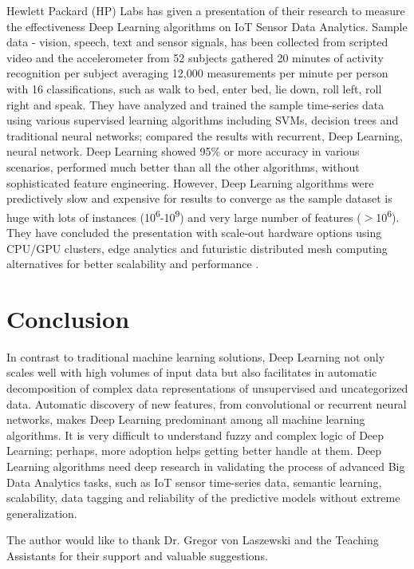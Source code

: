 \documentclass[sigconf]{acmart}
\begin{document}
	Hewlett Packard (HP) Labs has given a presentation of their research to measure the effectiveness Deep Learning algorithms on IoT Sensor Data Analytics. Sample data - vision, speech, text and sensor signals, has been collected from scripted video and the accelerometer from 52 subjects gathered 20 minutes of activity recognition per subject averaging 12,000 measurements per minute per person with 16 classifications, such as walk to bed, enter bed, lie down, roll left, roll right and speak. They have analyzed and trained the sample time-series data using various supervised learning algorithms including SVMs, decision trees and traditional neural networks; compared the results with recurrent, Deep Learning, neural network. Deep Learning showed 95\% or more accuracy in various scenarios, performed much better than all the other algorithms, without sophisticated feature engineering. However, Deep Learning algorithms were predictively slow and expensive for results to converge as the sample dataset is huge with lots of instances (10\textsuperscript{6}-10\textsuperscript{9}) and very large number of features ($>$10\textsuperscript{6}). They have concluded the presentation with scale-out hardware options using CPU/GPU clusters, edge analytics and futuristic distributed mesh computing alternatives for better scalability and performance \cite{Vassilieva2016}. 
			
	\section{Conclusion}		

	In contrast to traditional machine learning solutions, Deep Learning not only scales well with high volumes of input data but also facilitates in automatic decomposition of complex data representations of unsupervised and uncategorized data. Automatic discovery of new features, from convolutional or recurrent neural networks, makes Deep Learning predominant among all machine learning algorithms. It is very difficult to understand fuzzy and complex logic of Deep Learning; perhaps, more adoption helps getting better handle at them. Deep Learning algorithms need deep research in validating the process of advanced Big Data Analytics tasks, such as IoT sensor time-series data, semantic learning, scalability, data tagging and reliability of the predictive models without extreme generalization.  
	
	
\begin{acks}		
	
The author would like to thank Dr. Gregor von Laszewski and the Teaching Assistants for their support and valuable suggestions.
		
\end{acks}


 
	

	
\end{document}
